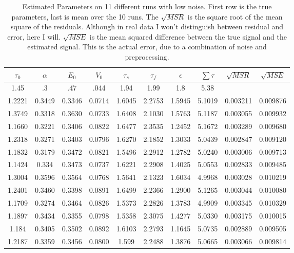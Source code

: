 \begin{table}[t]
\centering
\begin{tabular}{|c | c | c | c | c | c | c | c | c | c |}
\hline 
$\tau_0$ & $\alpha$ & $E_0$    & $V_0$    & $\tau_s$ & $\tau_f$ & $\epsilon$  & $ \sum \tau $ & $\sqrt{MSR}$ &$\sqrt{MSE}$\\
\hline 
\rowcolor[gray]{.8}
1.45 & .3 & .47 & .044 & 1.94 & 1.99 & 1.8  & 5.38 &  & \\
\hline 
\hline 
1.2221 & 0.3449 & 0.3346 & 0.0714 & 1.6045 & 2.2753 & 1.5945 & 5.1019 &  0.003211  & 0.009876  \\
1.3749 & 0.3318 & 0.3630 & 0.0733 & 1.6408 & 2.1030 & 1.5763 & 5.1187 &  0.003055  & 0.009932  \\
1.1660 & 0.3221 & 0.3406 & 0.0822 & 1.6477 & 2.3535 & 1.2452 & 5.1672 &  0.003289  & 0.009680  \\
1.2318 & 0.3271 & 0.3403 & 0.0796 & 1.6270 & 2.1852 & 1.3033 & 5.0439 &  0.002847  & 0.009120  \\
1.1832 & 0.3179 & 0.3472 & 0.0821 & 1.5496 & 2.2912 & 1.2782 & 5.0240 &  0.003006  & 0.009713  \\
1.1424 & 0.334  & 0.3473 & 0.0737 & 1.6221 & 2.2908 & 1.4025 & 5.0553 &  0.002833  & 0.009485  \\
1.3004 & 0.3596 & 0.3564 & 0.0768 & 1.5641 & 2.1323 & 1.6034 & 4.9968 &  0.003028  & 0.010219  \\
1.2401 & 0.3460 & 0.3398 & 0.0891 & 1.6499 & 2.2366 & 1.2900 & 5.1265 &  0.003044  & 0.010080  \\
1.1709 & 0.3274 & 0.3464 & 0.0826 & 1.5373 & 2.2826 & 1.3783 & 4.9909 &  0.003345  & 0.010329  \\
1.1897 & 0.3434 & 0.3355 & 0.0798 & 1.5358 & 2.3075 & 1.4277 & 5.0330 &  0.003175  & 0.010015  \\
1.184 &  0.3405 & 0.3502 & 0.0892 & 1.6103 & 2.2793 & 1.1645 & 5.0735 &  0.002889  & 0.009505  \\
\hline                                                                           
1.2187 & 0.3359 & 0.3456 & 0.0800 & 1.599 & 2.2488 & 1.3876 & 5.0665 & 0.003066     & 0.009814 \\
\hline 
\end{tabular}
\caption{Estimated Parameters on 11 different runs with low noise. First row is the true parameters,
last is mean over the 10 runs. The $\sqrt{MSR}$ is the square root of the mean square of the
residuals. Although in real data I won't distinguish between residual and error, here I will.
$\sqrt{MSE}$ is the mean squared difference between the true signal and the estimated signal.
This is the actual error, due to a combination of noise and preprocessing. }
\label{tab:LowNoiseResults} 
\end{table}

